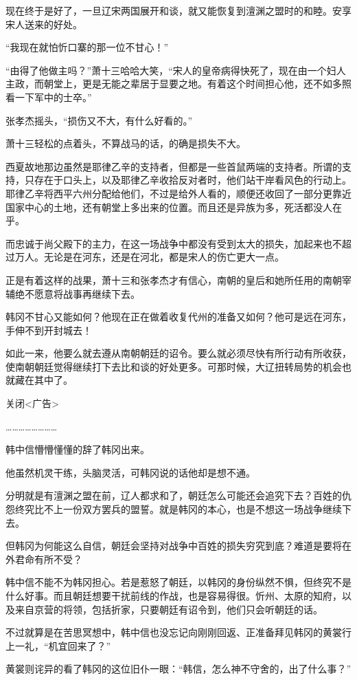 现在终于是好了，一旦辽宋两国展开和谈，就又能恢复到澶渊之盟时的和睦。安享宋人送来的好处。

“我现在就怕忻口寨的那一位不甘心！”

“由得了他做主吗？”萧十三哈哈大笑，“宋人的皇帝病得快死了，现在由一个妇人主政，而朝堂上，更是无能之辈居于显要之地。有着这个时间担心他，还不如多照看一下军中的士卒。”

张孝杰摇头，“损伤又不大，有什么好看的。”

萧十三轻松的点着头，不算战马的话，的确是损失不大。

西夏故地那边虽然是耶律乙辛的支持者，但都是一些首鼠两端的支持者。所谓的支持，只存在于口头上，以及耶律乙辛收拾反对者时，他们站干岸看风色的行动上。耶律乙辛将西平六州分配给他们，不过是给外人看的，顺便还收回了一部分更靠近国家中心的土地，还有朝堂上多出来的位置。而且还是异族为多，死活都没人在乎。

而忠诚于尚父殿下的主力，在这一场战争中都没有受到太大的损失，加起来也不超过万人。无论是在河东，还是在河北，都是宋人的伤亡更大一点。

正是有着这样的战果，萧十三和张孝杰才有信心，南朝的皇后和她所任用的南朝宰辅绝不愿意将战事再继续下去。

韩冈不甘心又能如何？他现在正在做着收复代州的准备又如何？他可是远在河东，手伸不到开封城去！

如此一来，他要么就去遵从南朝朝廷的诏令。要么就必须尽快有所行动有所收获，使南朝朝廷觉得继续打下去比和谈的好处更多。可那时候，大辽扭转局势的机会也就藏在其中了。

关闭<广告>

……………………

韩中信懵懵懂懂的辞了韩冈出来。

他虽然机灵干练，头脑灵活，可韩冈说的话他却是想不通。

分明就是有澶渊之盟在前，辽人都求和了，朝廷怎么可能还会追究下去？百姓的仇怨终究比不上一份双方罢兵的盟誓。就是韩冈的本心，也是不想这一场战争继续下去。

但韩冈为何能这么自信，朝廷会坚持对战争中百姓的损失穷究到底？难道是要将在外君命有所不受？

韩中信不能不为韩冈担心。若是惹怒了朝廷，以韩冈的身份纵然不惧，但终究不是什么好事。而且朝廷想要干扰前线的作战，也是容易得很。忻州、太原的知府，以及来自京营的将领，包括折家，只要朝廷有诏令到，他们只会听朝廷的话。

不过就算是在苦思冥想中，韩中信也没忘记向刚刚回返、正准备拜见韩冈的黄裳行上一礼，“机宜回来了？”

黄裳则诧异的看了韩冈的这位旧仆一眼：“韩信，怎么神不守舍的，出了什么事？”

